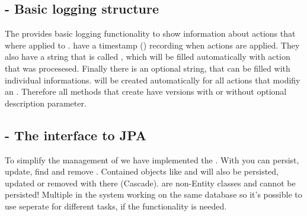 \subsection{ - Basic logging structure}
The  provides basic logging functionality to show information about actions that where applied to .  have a timestamp () recording when actions are applied. They also have a string that is called , which will be filled automatically with action that was procesesed. Finally there is an optional  string, that can be filled with individual informations.
 will be created automatically for all actions that modifiy an . Therefore all methods that create  have versions with or without optional description parameter.

\subsection{ - The interface to JPA}
To simplify the management of  we have implemented the . With  you can persist, update, find and remove . Contained objects like  and  will also be persisted, updated or removed with there  (Cascade).
 are non-Entity classes and cannot be persisted! Multiple  in the system working on the same database so it's possible to use seperate  for different tasks, if the functionality is needed. 

